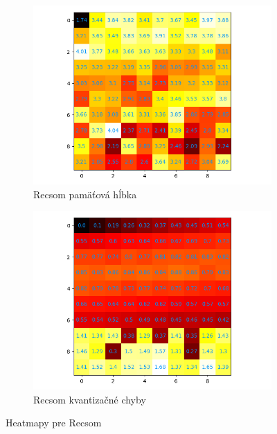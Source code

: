  
\begin{figure}[H]
    \centering
    \begin{subfigure}{.5\textwidth}
        \centering
        \includegraphics[width=\linewidth]{assets/recsom_memory_span}
        \caption{Recsom pamäťová hĺbka}
        \label{fig:sub1}
    \end{subfigure}%
    \begin{subfigure}{.5\textwidth}
        \centering
        \includegraphics[width=\linewidth]{assets/recsom_quantization_errors}
        \caption{Recsom kvantizačné chyby}
        \label{fig:sub2}
    \end{subfigure}
    \caption{Heatmapy pre Recsom}
    \label{fig:test}
\end{figure}

